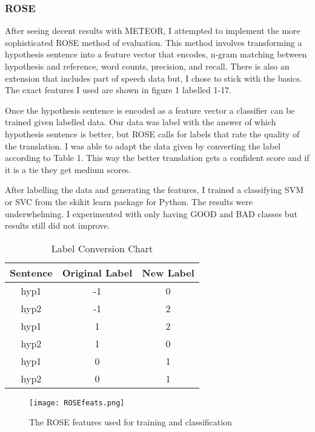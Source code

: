 \documentclass{article}
\begin{document}
\subsubsection{ROSE}
\par
After seeing decent results with METEOR, I attempted to implement the more sophisticated ROSE method of evaluation. This method involves transforming a hypothesis sentence into a feature vector that encodes, n-gram matching between hypothesis and reference, word counts, precision, and recall. There is also an extension that includes part of speech data but, I chose to stick with the basics. The exact features I used are shown in figure 1 labelled 1-17.
\par
Once the hypothesis sentence is encoded as a feature vector a classifier can be trained given labelled data. Our data was label with the answer of which hypothesis sentence is better, but ROSE calls for labels that rate the quality of the translation. I was able to adapt the data given by converting the label according to Table 1. This way the better translation gets a confident score and if it is a tie they get medium scores. 
\par
After labelling the data and generating the features, I trained a classifying SVM or SVC from the skikit learn package for Python. The results were underwhelming. I experimented with only having GOOD and BAD classes but results still did not improve. 

\begin{table}[!h]
\caption{Label Conversion Chart}
\begin{center}

\begin{tabular}{|c|c|c|}
	\hline
	Sentence & Original Label & New Label \\
	\hline
	 hyp1 & -1 & 0 \\
	\hline
	 hyp2 & -1 & 2 \\
	 \hline
	 hyp1 & 1 & 2 \\
	\hline
	 hyp2 & 1 & 0 \\
	\hline
	 hyp1 & 0 & 1 \\
	\hline
	 hyp2 & 0 & 1 \\
	 \hline
	 
\end{tabular}
\end{center}

\end{table}

\begin{figure}[!h]
\texttt{[image: ROSEfeats.png]}
\centering
\caption{The ROSE features used for training and classification}
\end{figure}
\end{document}
